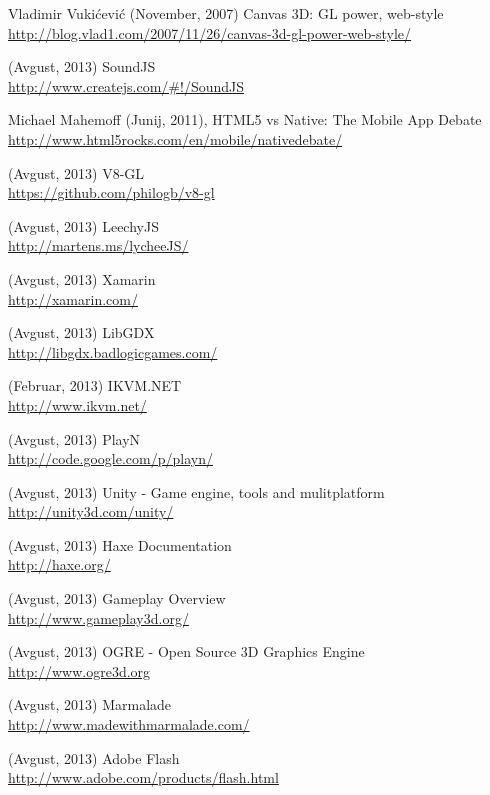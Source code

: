 \begin{thebibliography}{1}
 Vladimir Vukićević (November, 2007) Canvas 3D: GL power, web-style
\\ \url{http://blog.vlad1.com/2007/11/26/canvas-3d-gl-power-web-style/}

 (Avgust, 2013) SoundJS
\\ \url{http://www.createjs.com/\#!/SoundJS}

 Michael Mahemoff (Junij, 2011), HTML5 vs Native: The Mobile App Debate
\\ \url{http://www.html5rocks.com/en/mobile/nativedebate/}

 (Avgust, 2013) V8-GL 
\\ \url{https://github.com/philogb/v8-gl}

 (Avgust, 2013) LeechyJS 
\\ \url{http://martens.ms/lycheeJS/}

 (Avgust, 2013) Xamarin
\\ \url{http://xamarin.com/}

 (Avgust, 2013) LibGDX 
\\ \url{http://libgdx.badlogicgames.com/}

 (Februar, 2013) IKVM.NET
\\ \url{http://www.ikvm.net/}

 (Avgust, 2013) PlayN 
\\ \url{http://code.google.com/p/playn/}

 (Avgust, 2013) Unity - Game engine, tools and mulitplatform
\\ \url{http://unity3d.com/unity/}

 (Avgust, 2013) Haxe Documentation
\\ \url{http://haxe.org/}

 (Avgust, 2013) Gameplay Overview
\\ \url{http://www.gameplay3d.org/}

 (Avgust, 2013) OGRE - Open Source 3D Graphics Engine
\\ \url{http://www.ogre3d.org}

 (Avgust, 2013) Marmalade
\\ \url{http://www.madewithmarmalade.com/}

 (Avgust, 2013) Adobe Flash
\\ \url{http://www.adobe.com/products/flash.html}


\end{thebibliography}
